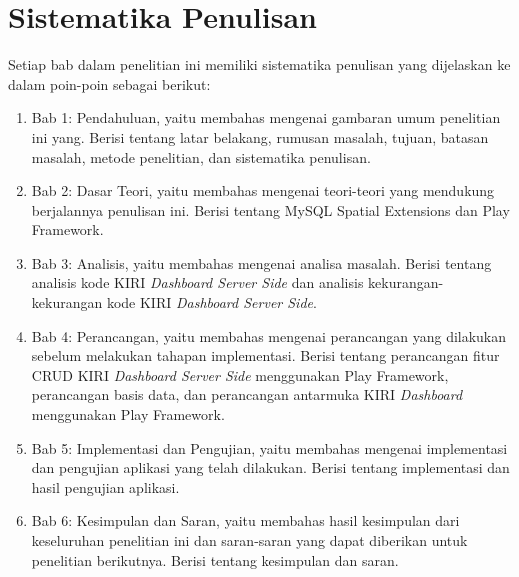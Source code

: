 \section{Sistematika Penulisan}
\label{sec:sistematika_penulisan}
Setiap bab dalam penelitian ini memiliki sistematika penulisan yang dijelaskan ke dalam poin-poin sebagai berikut:
	\begin{enumerate}
		\item Bab 1: Pendahuluan, yaitu membahas mengenai gambaran umum penelitian ini yang. Berisi tentang latar belakang, rumusan masalah, tujuan, batasan masalah, metode penelitian, dan sistematika penulisan.
		\item Bab 2: Dasar Teori, yaitu membahas mengenai teori-teori yang mendukung berjalannya penulisan ini. Berisi tentang MySQL Spatial Extensions dan Play Framework.
		\item Bab 3: Analisis, yaitu membahas mengenai analisa masalah. Berisi tentang analisis kode KIRI \textit{Dashboard Server Side} dan analisis kekurangan-kekurangan kode KIRI \textit{Dashboard Server Side}.
		\item Bab 4: Perancangan, yaitu membahas mengenai perancangan yang dilakukan sebelum melakukan tahapan implementasi. Berisi tentang perancangan fitur CRUD KIRI \textit{Dashboard Server Side} menggunakan Play Framework, perancangan basis data, dan perancangan antarmuka KIRI \textit{Dashboard} menggunakan Play Framework.
		\item Bab 5: Implementasi dan Pengujian, yaitu membahas mengenai implementasi dan pengujian aplikasi yang telah dilakukan. Berisi tentang implementasi dan hasil pengujian aplikasi.
		\item Bab 6: Kesimpulan dan Saran, yaitu membahas hasil kesimpulan dari keseluruhan penelitian ini dan saran-saran yang dapat
diberikan untuk penelitian berikutnya. Berisi tentang kesimpulan dan saran.
	\end{enumerate}